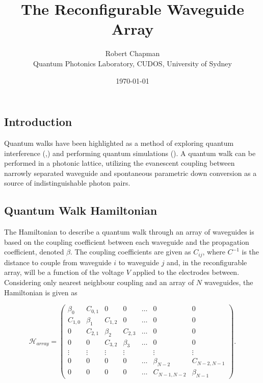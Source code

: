 \documentclass[11pt,a4paper]{article}
\begin{document}
\title{The Reconfigurable Waveguide Array}
\date{\today}
\author{Robert Chapman\\Quantum Photonics Laboratory, CUDOS, University of Sydney}
\maketitle

\subsection*{Introduction}

Quantum walks have been highlighted as a method of exploring quantum interference (\cite{Aharonov},\cite{Peruzzo}) and performing quantum simulations (\cite{Schreiber}). A quantum walk can be performed in a photonic lattice, utilizing the evanescent coupling between narrowly separated waveguide and spontaneous parametric down conversion as a source of indistinguishable photon pairs. 

\subsection*{Quantum Walk Hamiltonian}

The Hamiltonian to describe a quantum walk through an array of waveguides is based on the coupling coefficient between each waveguide and the propagation coefficient, denoted $\beta$. The coupling coefficients are given as $C_{ij}$, where $C^{-1}$ is the distance to couple from waveguide $i$ to waveguide $j$ and, in the reconfigurable array, will be a function of the voltage $V$ applied to the electrodes between. Considering only nearest neighbour coupling and an array of $N$ waveguides, the Hamiltonian is given as

\begin{equation}
\mathcal{H} _{array} = \begin{pmatrix}
\beta_0 & C_{0,1} & 0 & 0 & \dots& 0 & 0 \\
C_{1,0} & \beta_1 & C_{1,2} & 0 & \dots & 0 & 0 \\
0 & C_{2,1} & \beta_2 & C_{2,3} & \dots & 0 & 0 \\
0 & 0 & C_{3,2} & \beta_3 & \dots & 0  & 0 \\
\vdots & \vdots & \vdots & \vdots &  & \vdots & \vdots \\
0 & 0 & 0 & 0  & \dots & \beta_{N-2} &  C_{N-2,N-1} \\
0 & 0 & 0 & 0  & \dots & C_{N-1,N-2} & \beta_{N-1}
\end{pmatrix}.
\label{Equation:H_array}
\end{equation}
\end{document}
